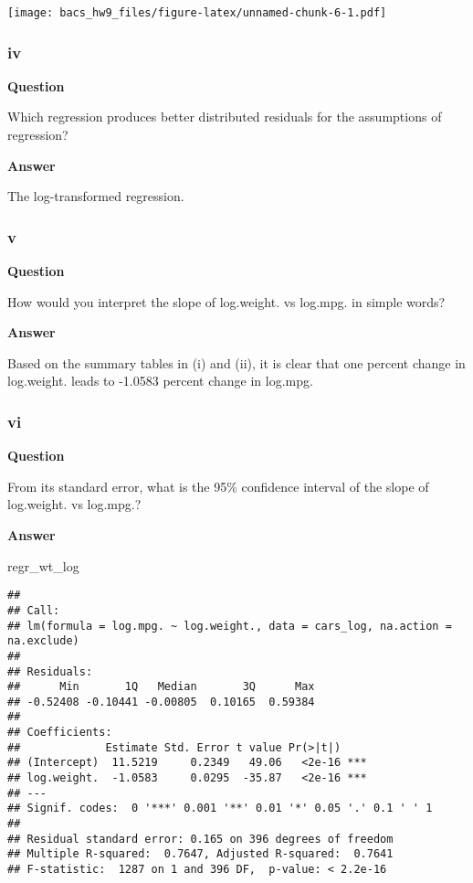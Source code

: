 \documentclass[
]{article}
\newenvironment{Shaded}{\begin{snugshade}}{\end{snugshade}}
\newcommand{\NormalTok}[1]{#1}
\begin{document}
\texttt{[image: bacs\_hw9\_files/figure-latex/unnamed-chunk-6-1.pdf]}

\hypertarget{iv}{%
\subsubsection{iv}\label{iv}}

\textbf{Question}

Which regression produces better distributed residuals for the
assumptions of regression?

\textbf{Answer}

The log-transformed regression.

\hypertarget{v}{%
\subsubsection{v}\label{v}}

\textbf{Question}

How would you interpret the slope of log.weight. vs log.mpg. in simple
words?

\textbf{Answer}

Based on the summary tables in (i) and (ii), it is clear that one
percent change in log.weight. leads to -1.0583 percent change in
log.mpg.

\hypertarget{vi}{%
\subsubsection{vi}\label{vi}}

\textbf{Question}

From its standard error, what is the 95\% confidence interval of the
slope of log.weight. vs log.mpg.?

\textbf{Answer}

\begin{Shaded}
\begin{Highlighting}[]
\NormalTok{regr\_wt\_log}
\end{Highlighting}
\end{Shaded}

\begin{verbatim}
## 
## Call:
## lm(formula = log.mpg. ~ log.weight., data = cars_log, na.action = na.exclude)
## 
## Residuals:
##      Min       1Q   Median       3Q      Max 
## -0.52408 -0.10441 -0.00805  0.10165  0.59384 
## 
## Coefficients:
##             Estimate Std. Error t value Pr(>|t|)    
## (Intercept)  11.5219     0.2349   49.06   <2e-16 ***
## log.weight.  -1.0583     0.0295  -35.87   <2e-16 ***
## ---
## Signif. codes:  0 '***' 0.001 '**' 0.01 '*' 0.05 '.' 0.1 ' ' 1
## 
## Residual standard error: 0.165 on 396 degrees of freedom
## Multiple R-squared:  0.7647, Adjusted R-squared:  0.7641 
## F-statistic:  1287 on 1 and 396 DF,  p-value: < 2.2e-16
\end{verbatim}
\end{document}
